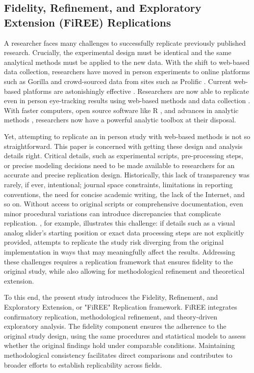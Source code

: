 \subsection{Fidelity, Refinement, and Exploratory Extension (FiREE) Replications}

A researcher faces many challenges to successfully replicate previously published research. Crucially, the experimental design must be identical and the same analytical methods must be applied to the new data. With the shift to web-based data collection, researchers have moved in person experiments to online platforms such as Gorilla \citep{Anwyl-Irvine_2019} and crowd-sourced data from sites such as Prolific \citep{douglas2023data}. Current web-based platforms are astonishingly effective \citep{tomczak2023over, eerola2021online}. Researchers are now able to replicate even in person eye-tracking results using web-based methods and data collection \citep[see ][] {semmelmann2018online, Vos_2022, Prystauka_Altmann_Rothman_2023}. With faster computers, open source software like R \citep{mizumoto_r_2015, Wickham2017R}, and advances in analytic methods \citep{gries2017ten}, researchers now have a powerful analytic toolbox at their disposal. 

Yet, attempting to replicate an in person study with web-based methods is not so straightforward. This paper is concerned with getting these design and analysis details right. Critical details, such as experimental scripts, pre-processing steps, or precise modeling decisions need to be made available to researchers for an accurate and precise replication design. Historically, this lack of transparency was rarely, if ever, intentional; journal space constraints, limitations in reporting conventions, the need for concise academic writing, the lack of the Internet, and so on. Without access to original scripts or comprehensive documentation, even minor procedural variations can introduce discrepancies that complicate replication. \cite{AOW}, for example, illustrates this challenge: if details such as a visual analog slider's starting position or exact data processing steps are not explicitly provided, attempts to replicate the study risk diverging from the original implementation in ways that may meaningfully affect the results. Addressing these challenges requires a replication framework that ensures fidelity to the original study, while also allowing for methodological refinement and theoretical extension.

To this end, the present study introduces the Fidelity, Refinement, and Exploratory Extension, or "FiREE" Replication framework. FiREE integrates confirmatory replication, methodological refinement, and theory-driven exploratory analysis. The fidelity component ensures the adherence to the original study design, using the same procedures and statistical models to assess whether the original findings hold under comparable conditions. Maintaining methodological consistency facilitates direct comparisons and contributes to broader efforts to establish replicability across fields. 

